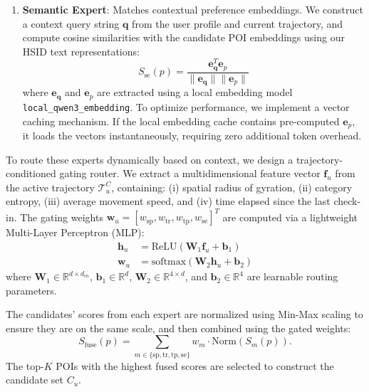 \documentclass[10pt,twocolumn]{article}
\newcommand{\code}[1]{\texttt{#1}}
\begin{document}
\begin{enumerate}
    \item \textbf{Semantic Expert}: Matches contextual preference embeddings. We construct a context query string $\mathbf{q}$ from the user profile and current trajectory, and compute cosine similarities with the candidate POI embeddings using our HSID text representations:
    \begin{equation}
        S_{\mathrm{se}}(p) = \frac{\mathbf{e}_{\mathbf{q}}^T \mathbf{e}_p}{\|\mathbf{e}_{\mathbf{q}}\| \|\mathbf{e}_p\|}
    \end{equation}
    where $\mathbf{e}_{\mathbf{q}}$ and $\mathbf{e}_p$ are extracted using a local embedding model \code{local\_qwen3\_embedding}. To optimize performance, we implement a vector caching mechanism. If the local embedding cache contains pre-computed $\mathbf{e}_p$, it loads the vectors instantaneously, requiring zero additional token overhead.
\end{enumerate}

To route these experts dynamically based on context, we design a trajectory-conditioned gating router. We extract a multidimensional feature vector $\mathbf{f}_u$ from the active trajectory $\mathcal{T}^C_u$, containing: (i) spatial radius of gyration, (ii) category entropy, (iii) average movement speed, and (iv) time elapsed since the last check-in. The gating weights $\mathbf{w}_u = [w_{\mathrm{sp}}, w_{\mathrm{tr}}, w_{\mathrm{tp}}, w_{\mathrm{se}}]^T$ are computed via a lightweight Multi-Layer Perceptron (MLP):
\begin{align}
    \mathbf{h}_u &= \mathrm{ReLU}(\mathbf{W}_1 \mathbf{f}_u + \mathbf{b}_1) \\
    \mathbf{w}_u &= \mathrm{softmax}(\mathbf{W}_2 \mathbf{h}_u + \mathbf{b}_2)
\end{align}
where $\mathbf{W}_1 \in \mathbb{R}^{d \times d_{in}}$, $\mathbf{b}_1 \in \mathbb{R}^d$, $\mathbf{W}_2 \in \mathbb{R}^{4 \times d}$, and $\mathbf{b}_2 \in \mathbb{R}^4$ are learnable routing parameters.

The candidates' scores from each expert are normalized using Min-Max scaling to ensure they are on the same scale, and then combined using the gated weights:
\begin{equation}
    S_{\mathrm{fuse}}(p) = \sum_{m \in \{\mathrm{sp, tr, tp, se}\}} w_m \cdot \mathrm{Norm}(S_m(p)).
\end{equation}
The top-$K$ POIs with the highest fused scores are selected to construct the candidate set $C_u$.
\end{document}
